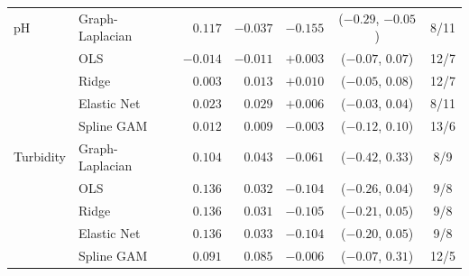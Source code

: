 \documentclass[11pt]{article}
\begin{document}
\begin{table}[h]
\begin{tabular}{ll rrrcc}
\addlinespace
pH            & Graph-Laplacian & $0.117$ & $-0.037$ & $\mathbf{-0.155}$ & ($-0.29$, $-0.05$) & 8/11 \\
              & OLS             & $-0.014$ & $-0.011$ & $+0.003$ & ($-0.07$, $0.07$) & 12/7 \\
              & Ridge           & $0.003$ & $0.013$ & $+0.010$ & ($-0.05$, $0.08$) & 12/7 \\
              & Elastic Net     & $0.023$ & $0.029$ & $+0.006$ & ($-0.03$, $0.04$) & 8/11 \\
              & Spline GAM      & $0.012$ & $0.009$ & $-0.003$ & ($-0.12$, $0.10$) & 13/6 \\
\addlinespace
Turbidity     & Graph-Laplacian & $0.104$ & $0.043$ & $-0.061$ & ($-0.42$, $0.33$) & 8/9 \\
              & OLS             & $0.136$ & $0.032$ & $-0.104$ & ($-0.26$, $0.04$) & 9/8 \\
              & Ridge           & $0.136$ & $0.031$ & $-0.105$ & ($-0.21$, $0.05$) & 9/8 \\
              & Elastic Net     & $0.136$ & $0.033$ & $-0.104$ & ($-0.20$, $0.05$) & 9/8 \\
              & Spline GAM      & $0.091$ & $0.085$ & $-0.006$ & ($-0.07$, $0.31$) & 12/5 \\
\bottomrule
\end{tabular}
\end{table}
\end{document}
